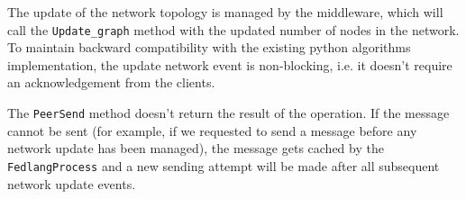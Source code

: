 The update of the network topology is managed by the middleware, which will call the \texttt{Update\_graph} method with the updated number of nodes in the network.
To maintain backward compatibility with the existing python algorithms implementation, the update network event is non-blocking, i.e. it doesn't require an acknowledgement from the clients.

The \texttt{PeerSend} method doesn't return the result of the operation. If the message cannot be sent (for example, if we requested to send a message before any network update has been managed), the message gets cached by the \texttt{FedlangProcess} and a new sending attempt will be made after all subsequent network update events.

